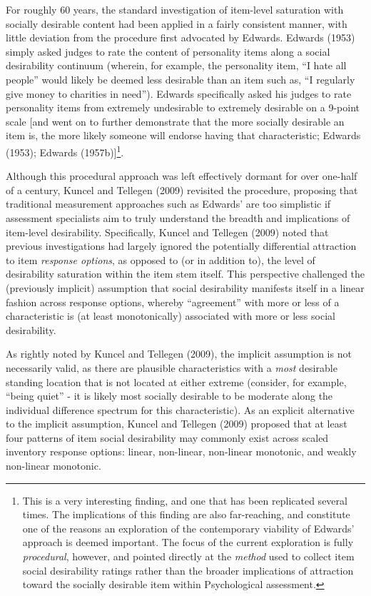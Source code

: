 \documentclass[
  english,
  ,jou]{apa6}
\begin{document}
For roughly 60 years, the standard investigation of item-level saturation with socially desirable content had been applied in a fairly consistent manner, with little deviation from the procedure first advocated by Edwards. Edwards (1953) simply asked judges to rate the content of personality items along a social desirability continuum (wherein, for example, the personality item, ``I hate all people'' would likely be deemed less desirable than an item such as, ``I regularly give money to charities in need''). Edwards specifically asked his judges to rate personality items from extremely undesirable to extremely desirable on a 9-point scale {[}and went on to further demonstrate that the more socially desirable an item is, the more likely someone will endorse having that characteristic; Edwards (1953); Edwards (1957b){]}\footnote{This is a very interesting finding, and one that has been replicated several times. The implications of this finding are also far-reaching, and constitute one of the reasons an exploration of the contemporary viability of Edwards' approach is deemed important. The focus of the current exploration is fully \emph{procedural}, however, and pointed directly at the \emph{method} used to collect item social desirability ratings rather than the broader implications of attraction toward the socially desirable item within Psychological assessment.}.

Although this procedural approach was left effectively dormant for over one-half of a century, Kuncel and Tellegen (2009) revisited the procedure, proposing that traditional measurement approaches such as Edwards' are too simplistic if assessment specialists aim to truly understand the breadth and implications of item-level desirability. Specifically, Kuncel and Tellegen (2009) noted that previous investigations had largely ignored the potentially differential attraction to item \emph{response options}, as opposed to (or in addition to), the level of desirability saturation within the item stem itself. This perspective challenged the (previously implicit) assumption that social desirability manifests itself in a linear fashion across response options, whereby ``agreement'' with more or less of a characteristic is (at least monotonically) associated with more or less social desirability.

As rightly noted by Kuncel and Tellegen (2009), the implicit assumption is not necessarily valid, as there are plausible characteristics with a \emph{most} desirable standing location that is not located at either extreme (consider, for example, ``being quiet'' - it is likely most socially desirable to be moderate along the individual difference spectrum for this characteristic). As an explicit alternative to the implicit assumption, Kuncel and Tellegen (2009) proposed that at least four patterns of item social desirability may commonly exist across scaled inventory response options: linear, non-linear, non-linear monotonic, and weakly non-linear monotonic.
\end{document}
